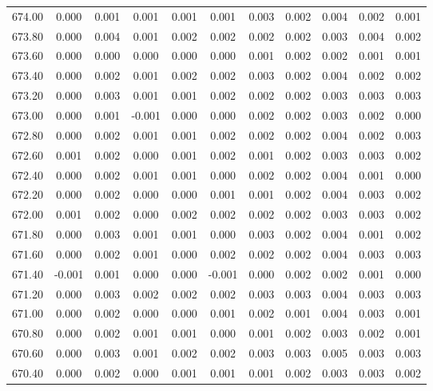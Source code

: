 \begin{longtable}{cccccccccc}
    674.00 &  0.000 &  0.001 &  0.001 &  0.001 &  0.001 &  0.003 &  0.002 &  0.004 &  0.002 &  0.001 \\
    673.80 &  0.000 &  0.004 &  0.001 &  0.002 &  0.002 &  0.002 &  0.002 &  0.003 &  0.004 &  0.002 \\
    673.60 &  0.000 &  0.000 &  0.000 &  0.000 &  0.000 &  0.001 &  0.002 &  0.002 &  0.001 &  0.001 \\
    673.40 &  0.000 &  0.002 &  0.001 &  0.002 &  0.002 &  0.003 &  0.002 &  0.004 &  0.002 &  0.002 \\
    673.20 &  0.000 &  0.003 &  0.001 &  0.001 &  0.002 &  0.002 &  0.002 &  0.003 &  0.003 &  0.003 \\
    673.00 &  0.000 &  0.001 & -0.001 &  0.000 &  0.000 &  0.002 &  0.002 &  0.003 &  0.002 &  0.000 \\
    672.80 &  0.000 &  0.002 &  0.001 &  0.001 &  0.002 &  0.002 &  0.002 &  0.004 &  0.002 &  0.003 \\
    672.60 &  0.001 &  0.002 &  0.000 &  0.001 &  0.002 &  0.001 &  0.002 &  0.003 &  0.003 &  0.002 \\
    672.40 &  0.000 &  0.002 &  0.001 &  0.001 &  0.000 &  0.002 &  0.002 &  0.004 &  0.001 &  0.000 \\
    672.20 &  0.000 &  0.002 &  0.000 &  0.000 &  0.001 &  0.001 &  0.002 &  0.004 &  0.003 &  0.002 \\
    672.00 &  0.001 &  0.002 &  0.000 &  0.002 &  0.002 &  0.002 &  0.002 &  0.003 &  0.003 &  0.002 \\
    671.80 &  0.000 &  0.003 &  0.001 &  0.001 &  0.000 &  0.003 &  0.002 &  0.004 &  0.001 &  0.002 \\
    671.60 &  0.000 &  0.002 &  0.001 &  0.000 &  0.002 &  0.002 &  0.002 &  0.004 &  0.003 &  0.003 \\
    671.40 & -0.001 &  0.001 &  0.000 &  0.000 & -0.001 &  0.000 &  0.002 &  0.002 &  0.001 &  0.000 \\
    671.20 &  0.000 &  0.003 &  0.002 &  0.002 &  0.002 &  0.003 &  0.003 &  0.004 &  0.003 &  0.003 \\
    671.00 &  0.000 &  0.002 &  0.000 &  0.000 &  0.001 &  0.002 &  0.001 &  0.004 &  0.003 &  0.001 \\
    670.80 &  0.000 &  0.002 &  0.001 &  0.001 &  0.000 &  0.001 &  0.002 &  0.003 &  0.002 &  0.001 \\
    670.60 &  0.000 &  0.003 &  0.001 &  0.002 &  0.002 &  0.003 &  0.003 &  0.005 &  0.003 &  0.003 \\
    670.40 &  0.000 &  0.002 &  0.000 &  0.001 &  0.001 &  0.001 &  0.002 &  0.003 &  0.003 &  0.002 \\

\end{longtable}

